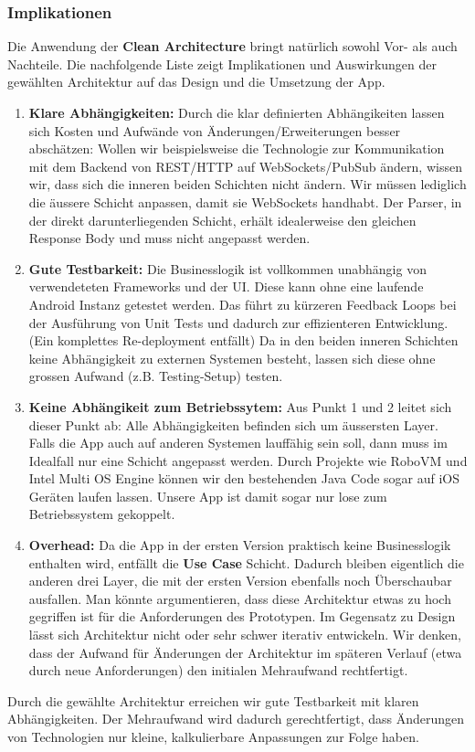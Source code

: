\documentclass[a4paper,10pt,xetex]{article}
\begin{document}
\subsubsection{Implikationen}\label{implications}
Die Anwendung der \textbf{Clean Architecture} bringt natürlich sowohl Vor- als auch Nachteile. Die nachfolgende Liste zeigt Implikationen und Auswirkungen der gewählten Architektur auf das Design und die Umsetzung der App. 
\begin{enumerate}
\item \textbf{Klare Abhängigkeiten:} Durch die klar definierten Abhängikeiten lassen sich Kosten und Aufwände von Änderungen/Erweiterungen besser abschätzen: Wollen wir beispielsweise die Technologie zur Kommunikation mit dem Backend von REST/HTTP auf WebSockets/PubSub ändern, wissen wir, dass sich die inneren beiden Schichten nicht ändern. Wir müssen lediglich die äussere Schicht anpassen, damit sie WebSockets handhabt. Der Parser, in der direkt darunterliegenden Schicht, erhält idealerweise den gleichen Response Body und muss nicht angepasst werden. 
\item \textbf{Gute Testbarkeit:} Die Businesslogik ist vollkommen unabhängig von verwendeteten Frameworks und der UI. Diese kann ohne eine laufende Android Instanz getestet werden. Das führt zu kürzeren Feedback Loops bei der Ausführung von Unit Tests und dadurch zur effizienteren Entwicklung. (Ein komplettes Re-deployment entfällt) 
Da in den beiden inneren Schichten keine Abhängigkeit zu externen Systemen besteht, lassen sich diese ohne grossen Aufwand (z.B. Testing-Setup) testen.
\item \textbf{Keine Abhängikeit zum Betriebssytem:} Aus Punkt 1 und 2 leitet sich dieser Punkt ab: Alle Abhängigkeiten befinden sich um äussersten Layer. Falls die App auch auf anderen Systemen lauffähig sein soll, dann muss im Idealfall nur eine Schicht angepasst werden. Durch Projekte wie RoboVM und Intel Multi OS Engine können wir den bestehenden Java Code sogar auf iOS Geräten laufen lassen. Unsere App ist damit sogar nur lose zum Betriebssystem gekoppelt.  
\item \textbf{Overhead:} Da die App in der ersten Version praktisch keine Businesslogik enthalten wird, entfällt die \textbf{Use Case} Schicht. Dadurch bleiben eigentlich die anderen drei Layer, die mit der ersten Version ebenfalls noch Überschaubar ausfallen. Man könnte argumentieren, dass diese Architektur etwas zu hoch gegriffen ist für die Anforderungen des Prototypen. Im Gegensatz zu Design lässt sich Architektur nicht oder sehr schwer iterativ entwickeln. Wir denken, dass der Aufwand für Änderungen der Architektur im späteren Verlauf (etwa durch neue Anforderungen) den initialen Mehraufwand rechtfertigt.   
\end{enumerate}
Durch die gewählte Architektur erreichen wir gute Testbarkeit mit klaren Abhängigkeiten. Der Mehraufwand wird dadurch gerechtfertigt, dass Änderungen von Technologien nur kleine, kalkulierbare Anpassungen zur Folge haben.
\end{document}
